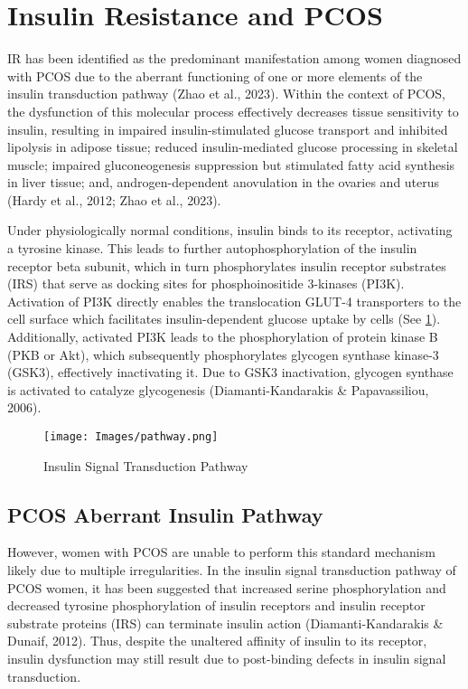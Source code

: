\section{Insulin Resistance and PCOS}
IR has been identified as the predominant manifestation among women diagnosed with PCOS due to the aberrant functioning of one or more elements of the insulin transduction pathway (Zhao et al., 2023). Within the context of PCOS, the dysfunction of this molecular process effectively decreases tissue sensitivity to insulin, resulting in impaired insulin-stimulated glucose transport and inhibited lipolysis in adipose tissue; reduced insulin-mediated glucose processing in skeletal muscle; impaired gluconeogenesis suppression but stimulated fatty acid synthesis in liver tissue; and, androgen-dependent anovulation in the ovaries and uterus (Hardy et al., 2012; Zhao et al., 2023).

Under physiologically normal conditions, insulin binds to its receptor, activating a tyrosine kinase. This leads to further autophosphorylation of the insulin receptor beta subunit, which in turn phosphorylates insulin receptor substrates (IRS) that serve as docking sites for phosphoinositide 3-kinases (PI3K). Activation of PI3K directly enables the translocation GLUT-4 transporters to the cell surface which facilitates insulin-dependent glucose uptake by cells (See \ref{fig:InsulinPath}). Additionally, activated PI3K leads to the phosphorylation of protein kinase B (PKB or Akt), which subsequently phosphorylates glycogen synthase kinase-3 (GSK3), effectively inactivating it. Due to GSK3 inactivation, glycogen synthase is activated to catalyze glycogenesis (Diamanti-Kandarakis \& Papavassiliou, 2006). 

\begin{figure} 
            \centering
            \texttt{[image: Images/pathway.png]}
            \caption{Insulin Signal Transduction Pathway}
            \label{fig:InsulinPath}
        \end{figure}

\subsection{PCOS Aberrant Insulin Pathway}
However, women with PCOS are unable to perform this standard mechanism likely due to multiple irregularities. In the insulin signal transduction pathway of PCOS women, it has been suggested that increased serine phosphorylation and decreased tyrosine phosphorylation of insulin receptors and insulin receptor substrate proteins (IRS) can terminate insulin action (Diamanti-Kandarakis \& Dunaif, 2012). Thus, despite the unaltered affinity of insulin to its receptor, insulin dysfunction may still result due to post-binding defects in insulin signal transduction. 

